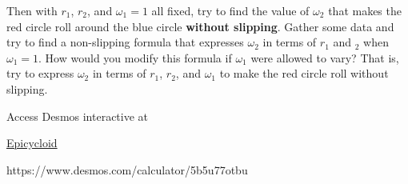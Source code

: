 \documentclass{ximera}
\begin{document}
\begin{exploration}
Then with $r_1$, $r_2$, and $\omega_1=1$ all fixed, try to find the value of $\omega_2$ that makes the red circle roll around the blue circle {\bf without slipping}. Gather some data and try to find a non-slipping formula that expresses $\omega_2$ in terms of $r_1$ and $_2$ when $\omega_1=1$. How would you modify this formula if $\omega_1$ were allowed to vary? That is, try to express $\omega_2$ in terms of $r_1$, $r_2$, and $\omega_1$ to make the red circle roll without slipping.

Access Desmos interactive at
 
\href{https://www.desmos.com/calculator/5b5u77otbu}{Epicycloid}

 
\begin{onlineOnly}
    \begin{center}
\end{center}
\end{onlineOnly}

https://www.desmos.com/calculator/5b5u77otbu


\end{exploration}
\end{document}
